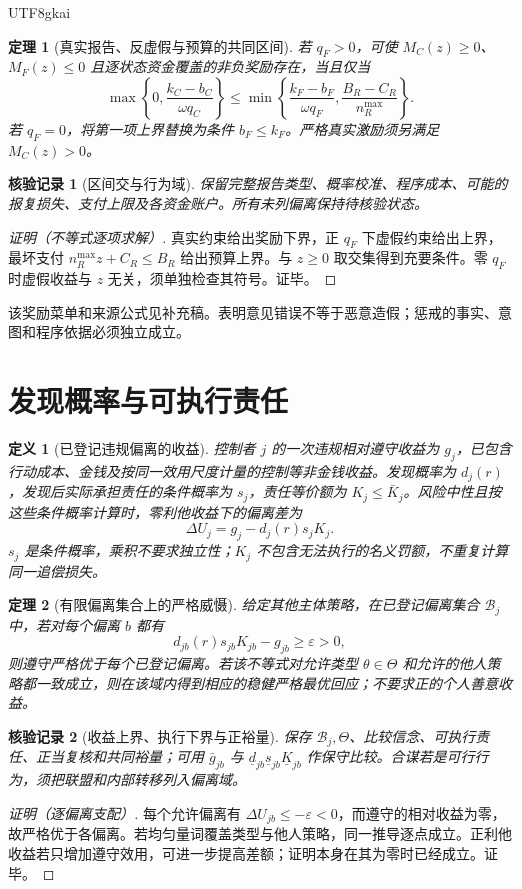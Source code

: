 \documentclass[12pt,a4paper,openany]{report}
\newtheorem{definition}{定义}[chapter]
\newtheorem{theorem}{定理}[chapter]
\newtheorem{Certificate}{核验记录}[chapter]
\begin{document}
\begin{CJK*}{UTF8}{gkai}
\begin{theorem}[真实报告、反虚假与预算的共同区间]
\label{thm:report}
若 $q_F>0$，可使 $M_C(z)\ge0$、$M_F(z)\le0$ 且逐状态资金覆盖的非负奖励存在，当且仅当
\[
 \max\left\{0,\frac{k_C-b_C}{\omega q_C}\right\}
 \le
 \min\left\{\frac{k_F-b_F}{\omega q_F},
 \frac{B_R-C_R}{n_R^{\max}}\right\}.
\]
若 $q_F=0$，将第一项上界替换为条件 $b_F\le k_F$。严格真实激励须另满足 $M_C(z)>0$。
\end{theorem}
\begin{Certificate}[区间交与行为域]
保留完整报告类型、概率校准、程序成本、可能的报复损失、支付上限及各资金账户。所有未列偏离保持待核验状态。
\end{Certificate}
\begin{proof}[证明（不等式逐项求解）]
真实约束给出奖励下界，正 $q_F$ 下虚假约束给出上界，最坏支付 $n_R^{\max}z+C_R\le B_R$ 给出预算上界。与 $z\ge0$ 取交集得到充要条件。零 $q_F$ 时虚假收益与 $z$ 无关，须单独检查其符号。证毕。
\end{proof}
该奖励菜单和来源公式见补充稿\cite{SourceSupplement}。表明意见错误不等于恶意造假；惩戒的事实、意图和程序依据必须独立成立。

\section{发现概率与可执行责任}
\begin{definition}[已登记违规偏离的收益]
\label{def:deterrence}
控制者 $j$ 的一次违规相对遵守收益为 $g_j$，已包含行动成本、金钱及按同一效用尺度计量的控制等非金钱收益。发现概率为 $d_j(r)$，发现后实际承担责任的条件概率为 $s_j$，责任等价额为 $K_j\le\bar K_j$。风险中性且按这些条件概率计算时，零利他收益下的偏离差为
\[
 \Delta U_j=g_j-d_j(r)s_jK_j.
\]
$s_j$ 是条件概率，乘积不要求独立性；$K_j$ 不包含无法执行的名义罚额，不重复计算同一追偿损失。
\end{definition}

\begin{theorem}[有限偏离集合上的严格威慑]
\label{thm:deterrence}
给定其他主体策略，在已登记偏离集合 $\mathcal B_j$ 中，若对每个偏离 $b$ 都有
\[
 d_{jb}(r)s_{jb}K_{jb}-g_{jb}\ge\varepsilon>0,
\]
则遵守严格优于每个已登记偏离。若该不等式对允许类型 $\theta\in\Theta$ 和允许的他人策略都一致成立，则在该域内得到相应的稳健严格最优回应；不要求正的个人善意收益。
\end{theorem}
\begin{Certificate}[收益上界、执行下界与正裕量]
保存 $\mathcal B_j,\Theta$、比较信念、可执行责任、正当复核和共同裕量；可用 $\bar g_{jb}$ 与 $\underline d_{jb}\underline s_{jb}\underline K_{jb}$ 作保守比较。合谋若是可行行为，须把联盟和内部转移列入偏离域。
\end{Certificate}
\begin{proof}[证明（逐偏离支配）]
每个允许偏离有 $\Delta U_{jb}\le-\varepsilon<0$，而遵守的相对收益为零，故严格优于各偏离。若均匀量词覆盖类型与他人策略，同一推导逐点成立。正利他收益若只增加遵守效用，可进一步提高差额；证明本身在其为零时已经成立。证毕。
\end{proof}


\end{CJK*}
\end{document}
